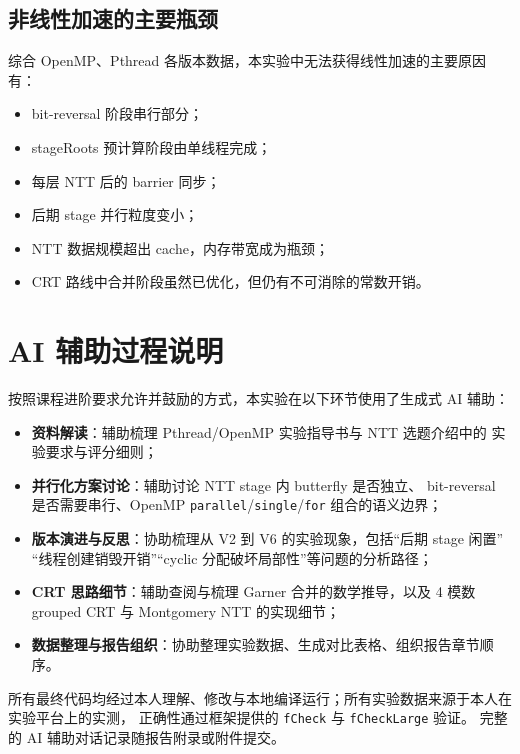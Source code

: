 \documentclass[UTF8,a4paper,10pt]{ctexart}
\begin{document}
\subsection{非线性加速的主要瓶颈}

综合 OpenMP、Pthread 各版本数据，本实验中无法获得线性加速的主要原因有：

\begin{itemize}
  \item bit-reversal 阶段串行部分；
  \item stageRoots 预计算阶段由单线程完成；
  \item 每层 NTT 后的 barrier 同步；
  \item 后期 stage 并行粒度变小；
  \item NTT 数据规模超出 cache，内存带宽成为瓶颈；
  \item CRT 路线中合并阶段虽然已优化，但仍有不可消除的常数开销。
\end{itemize}

\section{AI 辅助过程说明}

按照课程进阶要求允许并鼓励的方式，本实验在以下环节使用了生成式 AI 辅助：

\begin{itemize}
  \item \textbf{资料解读}：辅助梳理 Pthread/OpenMP 实验指导书与 NTT 选题介绍中的
        实验要求与评分细则；
  \item \textbf{并行化方案讨论}：辅助讨论 NTT stage 内 butterfly 是否独立、
        bit-reversal 是否需要串行、OpenMP \texttt{parallel}/\texttt{single}/\texttt{for}
        组合的语义边界；
  \item \textbf{版本演进与反思}：协助梳理从 V2 到 V6 的实验现象，包括``后期 stage 闲置''
        ``线程创建销毁开销''``cyclic 分配破坏局部性''等问题的分析路径；
  \item \textbf{CRT 思路细节}：辅助查阅与梳理 Garner 合并的数学推导，以及 4 模数
        grouped CRT 与 Montgomery NTT 的实现细节；
  \item \textbf{数据整理与报告组织}：协助整理实验数据、生成对比表格、组织报告章节顺序。
\end{itemize}

所有最终代码均经过本人理解、修改与本地编译运行；所有实验数据来源于本人在实验平台上的实测，
正确性通过框架提供的 \texttt{fCheck} 与 \texttt{fCheckLarge} 验证。
完整的 AI 辅助对话记录随报告附录或附件提交。
\end{document}
